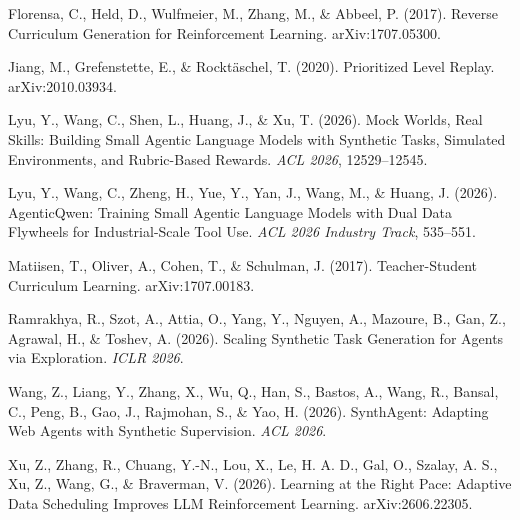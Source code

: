 \documentclass[
]{article}
\begin{document}
Florensa, C., Held, D., Wulfmeier, M., Zhang, M., \& Abbeel, P. (2017).
Reverse Curriculum Generation for Reinforcement Learning.
arXiv:1707.05300.

Jiang, M., Grefenstette, E., \& Rocktäschel, T. (2020). Prioritized
Level Replay. arXiv:2010.03934.

Lyu, Y., Wang, C., Shen, L., Huang, J., \& Xu, T. (2026). Mock Worlds,
Real Skills: Building Small Agentic Language Models with Synthetic
Tasks, Simulated Environments, and Rubric-Based Rewards. \emph{ACL
2026}, 12529--12545.

Lyu, Y., Wang, C., Zheng, H., Yue, Y., Yan, J., Wang, M., \& Huang, J.
(2026). AgenticQwen: Training Small Agentic Language Models with Dual
Data Flywheels for Industrial-Scale Tool Use. \emph{ACL 2026 Industry
Track}, 535--551.

Matiisen, T., Oliver, A., Cohen, T., \& Schulman, J. (2017).
Teacher-Student Curriculum Learning. arXiv:1707.00183.

Ramrakhya, R., Szot, A., Attia, O., Yang, Y., Nguyen, A., Mazoure, B.,
Gan, Z., Agrawal, H., \& Toshev, A. (2026). Scaling Synthetic Task
Generation for Agents via Exploration. \emph{ICLR 2026}.

Wang, Z., Liang, Y., Zhang, X., Wu, Q., Han, S., Bastos, A., Wang, R.,
Bansal, C., Peng, B., Gao, J., Rajmohan, S., \& Yao, H. (2026).
SynthAgent: Adapting Web Agents with Synthetic Supervision. \emph{ACL
2026}.

Xu, Z., Zhang, R., Chuang, Y.-N., Lou, X., Le, H. A. D., Gal, O.,
Szalay, A. S., Xu, Z., Wang, G., \& Braverman, V. (2026). Learning at
the Right Pace: Adaptive Data Scheduling Improves LLM Reinforcement
Learning. arXiv:2606.22305.
\end{document}
